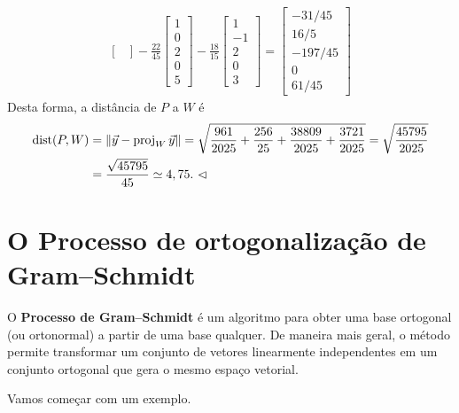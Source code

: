 \documentclass[../livro.tex]{subfiles}  %
\begin{document}
\begin{example}
\begin{align*}
\begin{bmatrix}
\end{bmatrix} - \frac{22}{45}
\begin{bmatrix}
1 \\ 0 \\ 2 \\ 0 \\ 5
\end{bmatrix} - \frac{18}{15}
\begin{bmatrix}
1 \\ -1 \\ 2 \\ 0 \\ 3
\end{bmatrix} =
\begin{bmatrix}
-31/45 \\ 16/5 \\ -197/45 \\ 0 \\ 61/45
\end{bmatrix}
  \end{align*}
  Desta forma, a distância de $P$ a $W$ é
  \begin{align*}
\operatorname{dist} (P,W) & = \|\vec{y} - \operatorname{proj}_{W} \vec{y}\| = \sqrt{\frac{961}{2025} + \frac{256}{25} + \frac{38809}{2025} + \frac{3721}{2025}} = \sqrt{\frac{ 45795 }{2025}} \\
           & = \frac{ \sqrt{45795} }{45} \simeq 4,75. \ \lhd
  \end{align*}
\end{example}




\section{O Processo de ortogonalização de Gram--Schmidt}

O \textbf{Processo de Gram--Schmidt} é um algoritmo para obter uma base ortogonal (ou ortonormal) a partir de uma base qualquer. De maneira mais geral, o método permite transformar um conjunto de vetores linearmente independentes em um conjunto ortogonal que gera o mesmo espaço vetorial. 

Vamos começar com um exemplo.
\end{document}
